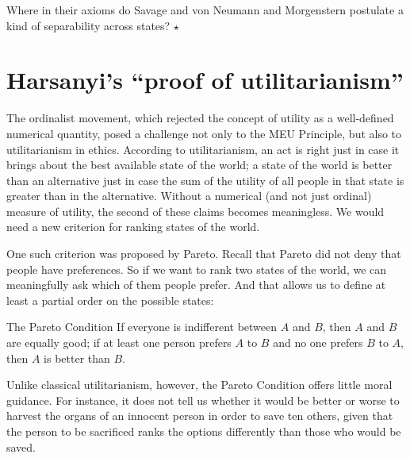 \begin{exercise}
  Where in their axioms do Savage and von Neumann and Morgenstern
  postulate a kind of separability across states?
  $\star$
\end{exercise}

\section{Harsanyi's ``proof of utilitarianism''}

The ordinalist movement, which rejected the concept of utility as a
well-defined numerical quantity, posed a challenge not only to the MEU
Principle, but also to utilitarianism in ethics. According to
utilitarianism, an act is right just in case it brings about the best
available state of the world; a state of the world is better than
an alternative just in case the sum of the utility of all people in
that state is greater than in the alternative. Without a numerical
(and not just ordinal) measure of utility, the second of these claims
becomes meaningless. We would need a new criterion for ranking states
of the world.

One such criterion was proposed by Pareto. Recall that Pareto did not
deny that people have preferences. So if we want to rank two states of
the world, we can meaningfully ask which of them people prefer. And
that allows us to define at least a partial order on the possible
states:
%
\begin{genericthm}{The Pareto Condition}
  If everyone is indifferent between  $A$ and $B$, then $A$ and $B$
  are equally good; if at least one person prefers $A$ to $B$ and no
  one prefers $B$ to $A$, then $A$ is better than $B$.
\end{genericthm}
%

Unlike classical utilitarianism, however, the Pareto Condition offers
little moral guidance. For instance, it does not tell us whether it
would be better or worse to harvest the organs of an innocent person
in order to save ten others, given that the person to be sacrificed
ranks the options differently than those who would be saved.


